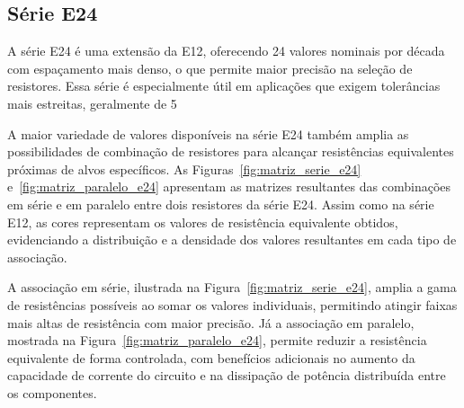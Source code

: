 \documentclass[conference]{IEEEtran}
\begin{document}



\subsection{Série E24}

A série E24 é uma extensão da E12, oferecendo 24 valores nominais por década com espaçamento mais denso, o que permite maior precisão na seleção de resistores. Essa série é especialmente útil em aplicações que exigem tolerâncias mais estreitas, geralmente de 5%

A maior variedade de valores disponíveis na série E24 também amplia as possibilidades de combinação de resistores para alcançar resistências equivalentes próximas de alvos específicos. As Figuras~\ref{fig:matriz_serie_e24} e~\ref{fig:matriz_paralelo_e24} apresentam as matrizes resultantes das combinações em série e em paralelo entre dois resistores da série E24. Assim como na série E12, as cores representam os valores de resistência equivalente obtidos, evidenciando a distribuição e a densidade dos valores resultantes em cada tipo de associação.

A associação em série, ilustrada na Figura~\ref{fig:matriz_serie_e24}, amplia a gama de resistências possíveis ao somar os valores individuais, permitindo atingir faixas mais altas de resistência com maior precisão. Já a associação em paralelo, mostrada na Figura~\ref{fig:matriz_paralelo_e24}, permite reduzir a resistência equivalente de forma controlada, com benefícios adicionais no aumento da capacidade de corrente do circuito e na dissipação de potência distribuída entre os componentes.
\end{document}
